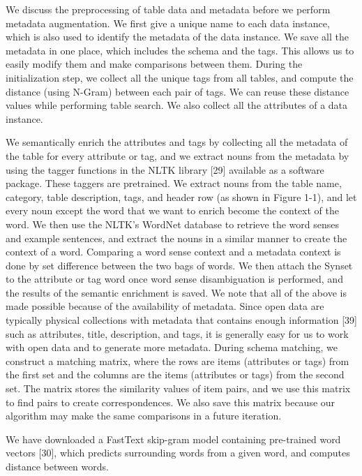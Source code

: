 We discuss the preprocessing of table data and metadata before we perform metadata augmentation. We first give a unique name to each data instance, which is also used to identify the metadata of the data instance. We save all the metadata in one place, which includes the schema and the tags. This allows us to easily modify them and make comparisons between them. During the initialization step, we collect all the unique tags from all tables, and compute the distance (using N-Gram) between each pair of tags. We can reuse these distance values while performing table search. We also collect all the attributes of a data instance.

We semantically enrich the attributes and tags by collecting all the metadata of the table for every attribute or tag, and we extract nouns from the metadata by using the tagger functions in the NLTK library [29] available as a software package. These taggers are pretrained. We extract nouns from the table name, category, table description, tags, and header row (as shown in Figure 1-1), and let every noun except the word that we want to enrich become the context of the word. We then use the NLTK's WordNet database to retrieve the word senses and example sentences, and extract the nouns in a similar manner to create the context of a word. Comparing a word sense context and a metadata context is done by set difference between the two bags of words. We then attach the Synset to the attribute or tag word once word sense disambiguation is performed, and the results of the semantic enrichment is saved.
We note that all of the above is made possible because of the availability of metadata. Since open data are typically physical collections with metadata that contains enough information [39] such as attributes, title, description, and tags, it is generally easy for us to work with open data and to generate more metadata.
During schema matching, we construct a matching matrix, where the rows are items (attributes or tags) from the first set and the columns are the items (attributes or tags) from the second set. The matrix stores the similarity values of item pairs, and we use this matrix to find pairs to create correspondences. We also save this matrix because our algorithm may make the same comparisons in a future iteration.

We have downloaded a FastText skip-gram model containing pre-trained word vectors [30], which predicts surrounding words from a given word, and computes distance between words.


